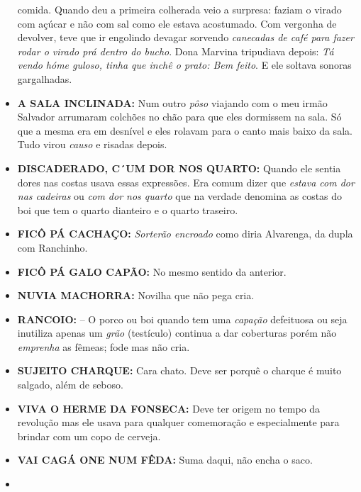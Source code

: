 \documentclass[12pt,brazil,]{book}
\begin{document}
\begin{itemize}
  comida. Quando deu a primeira colherada veio a surpresa: faziam o
  virado com açúcar e não com sal como ele estava acostumado. Com
  vergonha de devolver, teve que ir engolindo devagar sorvendo
  \emph{canecadas de café para fazer rodar o virado prá dentro do
  bucho}. Dona Marvina tripudiava depois: \emph{Tá vendo hóme guloso,
  tinha que inchê o prato: Bem feito}. E ele soltava sonoras
  gargalhadas.\\
\item
  \textbf{A SALA INCLINADA:} Num outro \emph{pôso} viajando com o meu
  irmão Salvador arrumaram colchões no chão para que eles dormissem na
  sala. Só que a mesma era em desnível e eles rolavam para o canto mais
  baixo da sala. Tudo virou \emph{causo} e risadas depois.\\
\item
  \textbf{DISCADERADO, C´UM DOR NOS QUARTO:} Quando ele sentia dores nas
  costas usava essas expressões. Era comum dizer que \emph{estava com
  dor nas cadeiras} ou \emph{com dor nos quarto} que na verdade denomina
  as costas do boi que tem o quarto dianteiro e o quarto traseiro.\\
\item
  \textbf{FICÔ PÁ CACHAÇO:} \emph{Sorterão encroado} como diria
  Alvarenga, da dupla com Ranchinho.\\
\item
  \textbf{FICÔ PÁ GALO CAPÃO:} No mesmo sentido da anterior.\\
\item
  \textbf{NUVIA MACHORRA:} Novilha que não pega cria.\\
\item
  \textbf{RANCOIO:} -- O porco ou boi quando tem uma \emph{capação}
  defeituosa ou seja inutiliza apenas um \emph{grão} (testículo)
  continua a dar coberturas porém não \emph{emprenha} as fêmeas; fode
  mas não cria.\\
\item
  \textbf{SUJEITO CHARQUE:} Cara chato. Deve ser porquê o charque é
  muito salgado, além de seboso.\\
\item
  \textbf{VIVA O HERME DA FONSECA:} Deve ter origem no tempo da
  revolução mas ele usava para qualquer comemoração e especialmente para
  brindar com um copo de cerveja.\\
\item
  \textbf{VAI CAGÁ ONE NUM FÊDA:} Suma daqui, não encha o saco.\\
\item

\end{itemize}
\end{document}
